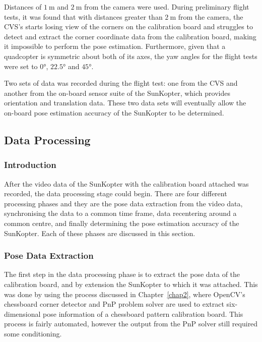 Distances of $\SI{1}{\m}$ and $\SI{2}{\m}$ from the camera were used. During preliminary flight tests, it was found that with distances greater than $\SI{2}{\m}$ from the camera, the CVS's starts losing view of the corners on the calibration board and struggles to detect and extract the corner coordinate data from the calibration board, making it impossible to perform the pose estimation. Furthermore, given that a quadcopter is symmetric about both of its axes, the yaw angles for the flight tests were set to $\ang{0}$, $\ang{22.5}$ and $\ang{45}$. 

Two sets of data was recorded during the flight test: one from the CVS and another from the on-board sensor suite of the SunKopter, which provides orientation and translation data. These two data sets will eventually allow the on-board pose estimation accuracy of the SunKopter to be determined. 

\subsection{Data Processing}

\subsubsection{Introduction}

After the video data of the SunKopter with the calibration board attached was recorded, the data processing stage could begin. There are four different processing phases and they are the pose data extraction from the video data, synchronising the data to a common time frame, data recentering around a common centre, and finally determining the pose estimation accuracy of the SunKopter. Each of these phases are discussed in this section. 

\subsubsection{Pose Data Extraction}

The first step in the data processing phase is to extract the pose data of the calibration board, and by extension the SunKopter to which it was attached. This was done by using the process discussed in Chapter~\ref{chap2}, where OpenCV's chessboard corner detector and PnP problem solver are used to extract six-dimensional pose information of a chessboard pattern calibration board. This process is fairly automated, however the output from the PnP solver still required some conditioning.

